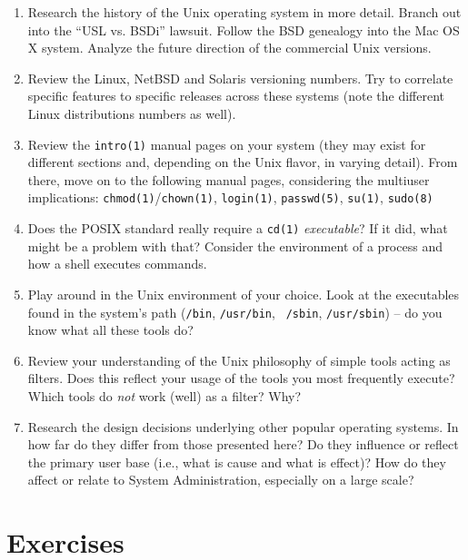 \begin{enumerate}
\item
Research the history of the Unix operating system in more detail.  Branch
out into the ``USL vs. BSDi'' lawsuit.  Follow the BSD genealogy into the
Mac OS X system.  Analyze the future direction of the commercial Unix
versions.

\item
Review the Linux, NetBSD and Solaris versioning numbers.  Try to correlate
specific features to specific releases across these systems (note the
different Linux distributions numbers as well).

\item
Review the {\tt intro(1)} manual pages on your system (they may exist for
different sections and, depending on the Unix flavor, in varying detail).
From there, move on to the following manual pages, considering the
multiuser implications: {\tt chmod(1)}/{\tt chown(1)}, {\tt login(1)},
{\tt passwd(5)}, {\tt su(1)}, {\tt sudo(8)}

\item
\label{prob:cd}
Does the POSIX standard really require a {\tt cd(1)} {\em executable}?  If
it did, what might be a problem with that?  Consider the environment of a
process and how a shell executes commands.

\item
Play around in the Unix environment of your choice.  Look at the
executables found in the system's path ({\tt /bin}, {\tt /usr/bin}, {\tt
/sbin}, {\tt /usr/sbin}) -- do you know what all these tools do?

\item
Review your understanding of the Unix philosophy of simple tools acting as
filters.  Does this reflect your usage of the tools you most frequently
execute?  Which tools do {\em not} work (well) as a filter?  Why?

\item
Research the design decisions underlying other popular operating systems.
In how far do they differ from those presented here?  Do they influence or
reflect the primary user base (i.e., what is cause and what is effect)?  How
do they affect or relate to System Administration, especially on a large
scale?

\end{enumerate}

\section*{Exercises}

